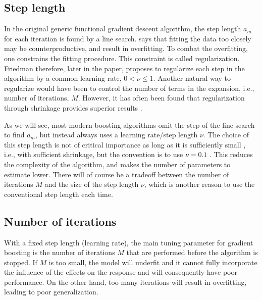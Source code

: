 \subsection{Step length}
In the original generic functional gradient descent algorithm, the step length $a_m$ for each iteration is found by a line search.
\citet{friedman2001} says that fitting the data too closely may be counterproductive, and result in overfitting. To combat the overfitting, one constrains the fitting procedure. This constraint is called regularization. Friedman therefore, later in the paper, proposes to regularize each step in the algorithm by a common learning rate, $0<\nu\leq1$. Another natural way to regularize would have been to control the number of terms in the expansion, i.e., number of iterations, $M$. However, it has often been found that regularization through shrinkage provides superior results \citep{copas1983}.

As we will see, most modern boosting algorithms omit the step of the line search to find $a_m$, but instead always uses a learning rate/step length $\nu$.  
The choice of this step length is not of critical importance as long as it is sufficiently small \citep{schmid-hothorn}, i.e., with sufficient shrinkage, but the convention is to use $\nu=0.1$ \citep{mayr14a}. This reduces the complexity of the algorithm, and makes the number of parameters to estimate lower. There will of course be a tradeoff between the number of iterations $M$ and the size of the step length $\nu$, which is another reason to use the conventional step length each time.

\subsection{Number of iterations}\label{subsec:iterations}
With a fixed step length (learning rate), the main tuning parameter for gradient boosting is the number of iterations $M$ that are performed before the algorithm is stopped. If $M$ is too small, the model will underfit and it cannot fully incorporate the influence of the effects on the response and will consequently have poor performance. On the other hand, too many iterations will result in overfitting, leading to poor generalization.


